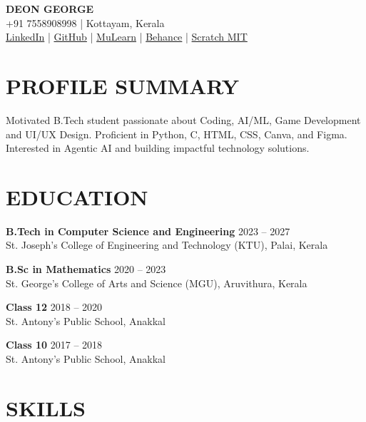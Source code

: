 \documentclass[10pt]{article}
\begin{document}

\begin{center}
    {\LARGE \textbf{DEON GEORGE}} \\
    +91 7558908998 | Kottayam, Kerala \\
    \href{https://www.linkedin.com/in/deon-george-vadakkel/}{LinkedIn} |
    \href{https://github.com/deon-george}{GitHub} |
    \href{https://app.mulearn.org/profile/deongeorge-1@mulearn}{MuLearn} |
    \href{https://www.behance.net/deongeorgeArt}{Behance} |
    \href{https://scratch.mit.edu/users/DeonGeorge}{Scratch MIT}
\end{center}


\section*{PROFILE SUMMARY}

Motivated B.Tech student passionate about Coding, AI/ML, Game Development and UI/UX Design. Proficient in Python, C, HTML, CSS, Canva, and Figma. Interested in Agentic AI and building impactful technology solutions.


\section*{EDUCATION}

\textbf{B.Tech in Computer Science and Engineering} \hfill 2023 -- 2027 \\
St. Joseph's College of Engineering and Technology (KTU), Palai, Kerala

\textbf{B.Sc in Mathematics} \hfill 2020 -- 2023 \\
St. George's College of Arts and Science (MGU), Aruvithura, Kerala

\textbf{Class 12} \hfill 2018 -- 2020 \\
St. Antony's Public School, Anakkal

\textbf{Class 10} \hfill 2017 -- 2018 \\
St. Antony's Public School, Anakkal


\section*{SKILLS}
\end{document}
